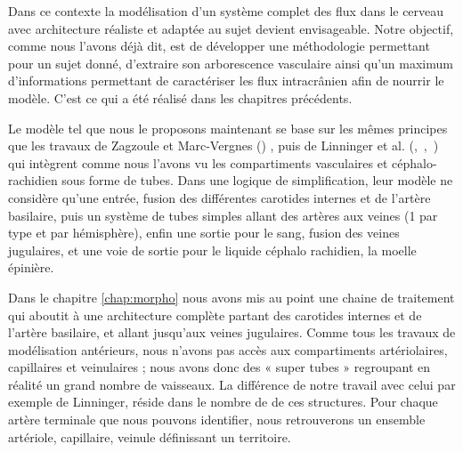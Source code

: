 Dans ce contexte la modélisation d’un système complet des flux dans le cerveau avec
architecture réaliste et adaptée au sujet devient envisageable. Notre objectif, comme nous l’avons
déjà dit, est de développer une méthodologie permettant pour un sujet donné, d’extraire son
arborescence vasculaire ainsi qu’un maximum d’informations permettant de caractériser les flux
intracrânien afin de nourrir le modèle. C’est ce qui a été réalisé dans les chapitres précédents.

Le modèle tel que nous le proposons maintenant se base sur les mêmes principes que les
travaux de Zagzoule et Marc-Vergnes (\cite{Zagzoule1986}) , puis de Linninger et al. (\cite{Linninger2005},~\cite{Linninger2007},~\cite{Linninger2009}) qui intègrent comme
nous l’avons vu les compartiments vasculaires et céphalo-rachidien sous forme de tubes. Dans une
logique de simplification, leur modèle ne considère qu’une entrée, fusion des différentes carotides
internes et de l’artère basilaire, puis un système de tubes simples allant des artères aux veines (1 par
type et par hémisphère), enfin une sortie pour le sang, fusion des veines jugulaires, et une voie de
sortie pour le liquide céphalo rachidien, la moelle épinière.

Dans le chapitre \ref{chap:morpho} nous avons mis au point une chaine de traitement qui aboutit à une
architecture complète partant des carotides internes et de l’artère basilaire, et allant jusqu’aux veines
jugulaires. Comme tous les travaux de modélisation antérieurs, nous n’avons pas accès aux
compartiments artériolaires, capillaires et veinulaires ; nous avons donc des « super tubes »
regroupant en réalité un grand nombre de vaisseaux. La différence de notre travail avec celui par
exemple de Linninger, réside dans le nombre de de ces structures. Pour chaque artère terminale que
nous pouvons identifier, nous retrouverons un ensemble artériole, capillaire, veinule définissant un
territoire.

